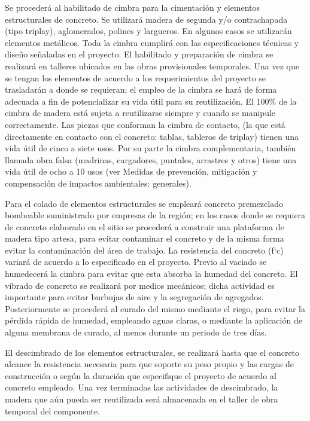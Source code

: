 \documentclass{article}
\begin{document}
\bigskip

Se procederá al habilitado de cimbra para la cimentación y elementos estructurales de concreto. Se utilizará madera de segunda y/o contrachapada (tipo triplay), aglomerados, polines y largueros. En algunos casos se utilizarán elementos metálicos. Toda la cimbra cumplirá con las especificaciones técnicas y diseño señaladas en el proyecto. El habilitado y preparación de cimbra se realizará en talleres ubicados en las obras provisionales temporales. Una vez que se tengan los elementos de acuerdo a los requerimientos del proyecto se trasladarán a donde se requieran; el empleo de la cimbra se hará de forma adecuada a fin de potencializar su vida útil para su reutilización. El 100\% de la cimbra de madera está sujeta a reutilizarse siempre y cuando se manipule correctamente. Las piezas que conforman la cimbra de contacto, (la que está directamente en contacto con el concreto: tablas, tableros de triplay) tienen una vida útil de cinco a siete usos. Por su parte la cimbra complementaria, también llamada obra falsa (madrinas, cargadores, puntales, arrastres y otros) tiene una vida útil de ocho a 10 usos (ver Medidas de prevención, mitigación y compensación de impactos ambientales: generales).

Para el colado de elementos estructurales se empleará concreto premezclado bombeable suministrado por empresas de la región; en los casos donde se requiera de concreto elaborado en el sitio se procederá a construir una plataforma de madera tipo artesa, para evitar contaminar el concreto y de la misma forma evitar la contaminación del área de trabajo. La resistencia del concreto (f`c) variará de acuerdo a lo especificado en el proyecto. Previo al vaciado se humedecerá la cimbra para evitar que esta absorba la humedad del concreto. El vibrado de concreto se realizará por medios mecánicos; dicha actividad es importante para evitar burbujas de aire y la segregación de agregados. Posteriormente se procederá al curado del mismo mediante el riego, para evitar la pérdida rápida de humedad, empleando aguas claras, o mediante la aplicación de alguna membrana de curado, al menos durante un periodo de tres días. 


\bigskip

El descimbrado de los elementos estructurales, se realizará hasta que el concreto alcance la resistencia necesaria para que soporte su peso propio y las cargas de construcción o según la duración que especifique el proyecto de acuerdo al concreto empleado. Una vez terminadas las actividades de descimbrado, la madera que aún pueda ser reutilizada será almacenada en el taller de obra temporal del componente.
\end{document}
